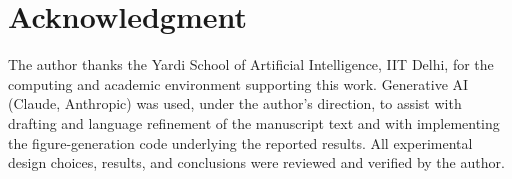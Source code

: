 \documentclass[conference]{IEEEtran}
\begin{document}
\section*{Acknowledgment}
The author thanks the Yardi School of Artificial Intelligence, IIT Delhi, for the computing and academic environment supporting this work. Generative AI (Claude, Anthropic) was used, under the author's direction, to assist with drafting and language refinement of the manuscript text and with implementing the figure-generation code underlying the reported results. All experimental design choices, results, and conclusions were reviewed and verified by the author.



\end{document}
